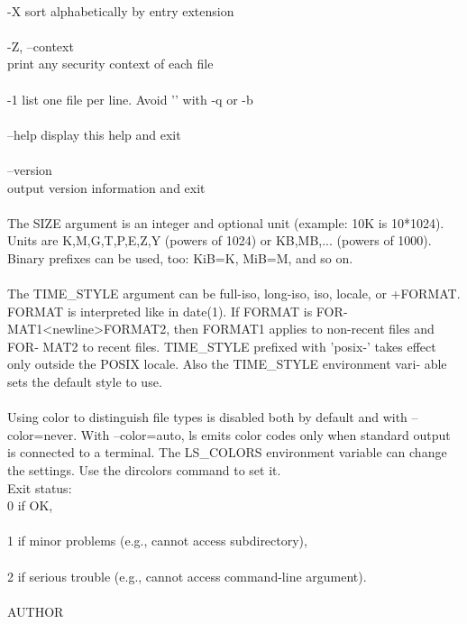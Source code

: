 \documentclass{article}
\begin{document}
\\
       -X     sort alphabetically by entry extension \\
\\
       -Z, --context \\
              print any security context of each file \\
\\
       -1     list one file per line.  Avoid '\n' with -q or -b \\
\\
       --help display this help and exit \\
\\
       --version \\
              output version information and exit \\
\\
       The  SIZE  argument  is  an  integer and optional unit (example: 10K is
       10*1024).  Units are K,M,G,T,P,E,Z,Y  (powers  of  1024)  or  KB,MB,...
       (powers  of 1000).  Binary prefixes can be used, too: KiB=K, MiB=M, and
       so on. \\
\\
       The TIME_STYLE argument can be  full-iso,  long-iso,  iso,  locale,  or
       +FORMAT.   FORMAT  is  interpreted  like in date(1).  If FORMAT is FOR‐
       MAT1<newline>FORMAT2, then FORMAT1 applies to non-recent files and FOR‐
       MAT2  to  recent files.  TIME_STYLE prefixed with 'posix-' takes effect
       only outside the POSIX locale.  Also the TIME_STYLE  environment  vari‐
       able sets the default style to use. \\
\\
       Using  color  to distinguish file types is disabled both by default and
       with --color=never.  With --color=auto, ls emits color codes only  when
       standard  output is connected to a terminal.  The LS_COLORS environment
       variable can change the settings.  Use the dircolors command to set it.
\\
   Exit status: \\
       0      if OK, \\
\\
       1      if minor problems (e.g., cannot access subdirectory), \\
\\
       2      if serious trouble (e.g., cannot access command-line argument). \\
\\
AUTHOR \\
\end{document}
